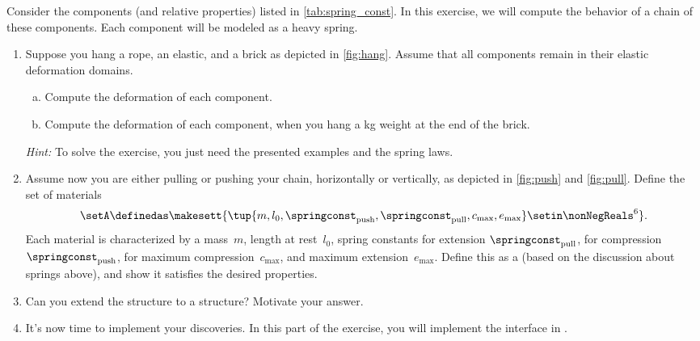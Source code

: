\begin{gradedexercise}
    \label{ex:Goldberg}
    Consider the components (and relative properties) listed in \cref{tab:spring_const}.
    In this exercise, we will compute the behavior of a chain of these components.
    Each component will be modeled as a heavy spring.
    \begin{enumerate}
        \item Suppose you hang a rope, an elastic, and a brick as depicted in \cref{fig:hang}.
              Assume that all components remain in their elastic deformation domains.
              \begin{enumerate}[(a)]
                  \item Compute the deformation of each component.
                  \item Compute the deformation of each component, when you hang a \unit[1]{kg} weight at the end of the brick.
              \end{enumerate}
              \emph{Hint:}
              To solve the exercise, you just need the presented examples and the spring laws.
        \item Assume now you are either pulling or pushing your chain, horizontally or vertically, as depicted in \cref{fig:push} and \cref{fig:pull}.
              Define the set of materials
              \begin{equation}
                  \setA\definedas \makesett{ \tup{m,l_0, \springconst_\mathrm{push},\springconst_\mathrm{pull}, c_\mathrm{max}, e_\mathrm{max}} \setin \nonNegReals^6}.
              \end{equation}
              Each material is characterized by a mass~$m$, length at rest~$l_0$, spring constants for extension $\springconst_\mathrm{pull}$, for compression~$\springconst_\mathrm{push}$, for maximum compression~$c_\mathrm{max}$, and maximum extension~$e_\mathrm{max}$.
              Define this as a  (based on the discussion about springs above), and show it satisfies the desired properties.
        \item Can you extend the  structure to a  structure?
              Motivate your answer.
        \item It's now time to implement your discoveries.
              In this part of the exercise, you will implement the interface in .


\end{enumerate}
\end{gradedexercise}
